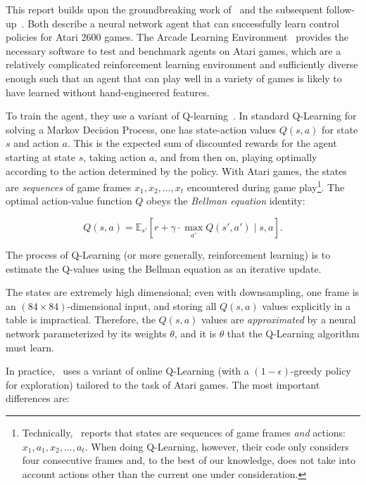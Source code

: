 \documentclass[letterpaper, 10 pt, conference]{ieeeconf}  %
\begin{document}
This report builds upon the groundbreaking work of~\cite{mnih-atari-2013} and the subsequent
follow-up~\cite{mnih-dqn-2015}. Both describe a neural network agent that can successfully
learn control policies for Atari 2600 games. The Arcade Learning
Environment~\cite{bellemare13arcade} provides the necessary software to test and benchmark agents on
Atari games, which are a relatively complicated reinforcement learning environment and sufficiently
diverse enough such that an agent that can play well in a variety of games is likely to have learned
without hand-engineered features.

To train the agent, they use a variant of Q-learning~\cite{Sutton_1998}. In standard Q-Learning for
solving a Markov Decision Process, one has state-action values $Q(s,a)$ for state $s$ and action
$a$. This is the expected sum of discounted rewards for the agent starting at state $s$, taking
action $a$, and from then on, playing optimally according to the action determined by the policy.
With Atari games, the states are \emph{sequences} of game frames $x_1,x_2,\ldots,x_t$ encountered
during game play\footnote{Technically,~\cite{mnih-atari-2013} reports that states are sequences of
game frames \emph{and} actions: $x_1,a_1,x_2,\ldots,a_t$. When doing Q-Learning, however, their code
only considers four consecutive frames and, to the best of our knowledge, does not take into account
actions other than the current one under consideration.}. The optimal action-value function $Q$
obeys the \emph{Bellman equation} identity: 

\begin{equation}\label{eq:bellman}
Q(s,a) = \mathbb{E}_{s'}\left[r + \gamma \cdot \max_{a'} Q(s',a') \mid s,a \right].
\end{equation}

The process of Q-Learning (or more generally, reinforcement learning) is to estimate the Q-values
using the Bellman equation as an iterative update.

The states are extremely high dimensional; even with downsampling, one frame is an $(84\times
84)$-dimensional input, and storing all $Q(s,a)$ values explicitly in a table is impractical.
Therefore, the $Q(s,a)$ values are \emph{approximated} by a neural network parameterized by its
weights $\theta$, and it is $\theta$ that the Q-Learning algorithm must learn.

In practice,~\cite{mnih-dqn-2015} uses a variant of online Q-Learning (with a $(1-\epsilon)$-greedy
policy for exploration) tailored to the task of Atari games.  The most important differences are:
\end{document}
